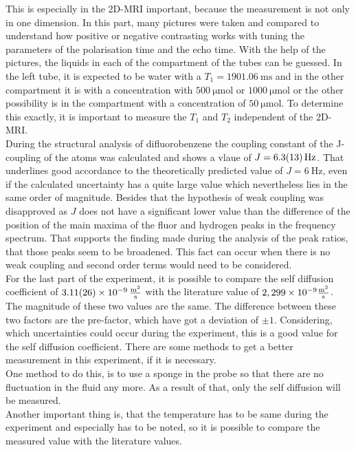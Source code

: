 This is especially in the 2D-MRI important, because the measurement is not only in one dimension. In this part, many pictures were taken and compared to understand how positive or negative contrasting works with tuning the parameters of the polarisation time and the echo time. With the help of the pictures, the liquids in each of the compartment of the tubes can be guessed. In the left tube, it is expected to be water with a $T_1=\SI{1901,06}{\milli\s}$ and in the other compartment it is  with a concentration with $\SI{500}{\micro\mole}$ or 
$\SI{1000}{\micro\mole}$ or the other possibility is  in the compartment with a concentration of $\SI{50}{\micro\mole}$. To determine this exactly, it is important to measure the $T_1$ and $T_2$ independent of the 2D-MRI.  \\
During the structural analysis of difluorobenzene the coupling constant of the J-coupling of the atoms was calculated and shows a vlaue of $J = \SI{6.3 \pm 1.3}{\hertz}$.
That underlines good accordance to the theoretically predicted value of $J= \SI{6}{\hertz}$, even if the calculated uncertainty has a quite large value which nevertheless lies in the same order of magnitude.
Besides that the hypothesis of weak coupling was disapproved as $J$ does not have a significant lower value than the difference of the position of the main maxima of the fluor and hydrogen peaks in the frequency spectrum.
That supports the finding made during the analysis of the peak ratios, that those peaks seem to be broadened. 
This fact can occur when there is no weak coupling and second order terms would need to be considered.\\
For the last part of the experiment, it is possible to compare the self diffusion coefficient of $\SI{3,11(26)e-9}{\frac{\m^2}{s}}$ with the literature value of $2,299\times  10^{-9}\si{\frac{\m^2}{\s}}$. The magnitude of these two values are the same. The difference between these two factors are the pre-factor, which have got a deviation of $\pm1$. Considering, which uncertainties could occur during the experiment, this is a good value for the self diffusion coefficient. There are some methods to get a better measurement in this experiment, if it is necessary. \\  
One method to do this, is to use a sponge in the probe so that there are no fluctuation in the fluid any more. As a result of that, only the self diffusion will be measured.\\
Another important thing is, that the temperature has to be same during the experiment and especially has to be noted, so it is possible to compare the measured value with the literature values. 